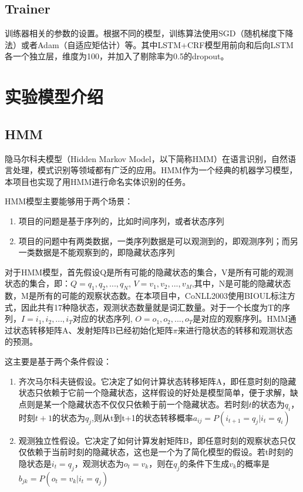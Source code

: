 \documentclass[a4paper, 12pt]{article}
\begin{document}
\subsection{Trainer} %
\label{sub:trainer}
训练器相关的参数的设置。根据不同的模型，训练算法使用SGD（随机梯度下降法）或者Adam（自适应矩估计）等。其中LSTM+CRF模型用前向和后向LSTM各一个独立层，维度为100，并加入了剔除率为0.5的dropout。

\section{实验模型介绍} %
\label{sec:model}

\subsection{HMM} %
\label{sub:hmm}
隐马尔科夫模型（Hidden Markov Model，以下简称HMM）在语言识别，自然语言处理，模式识别等领域都有广泛的应用。HMM作为一个经典的机器学习模型，本项目也实现了用HMM进行命名实体识别的任务。

HMM模型主要能够用于两个场景：
\begin{enumerate}
    \item 项目的问题是基于序列的，比如时间序列，或者状态序列
    \item 项目的问题中有两类数据，一类序列数据是可以观测到的，即观测序列；而另一类数据是不能观察到的，即隐藏状态序列
\end{enumerate}

对于HMM模型，首先假设Q是所有可能的隐藏状态的集合，V是所有可能的观测状态的集合，即：$Q={q_1, q_2, ..., q_N}$, $V={v_1, v_2,...,v_M}$,其中，N是可能的隐藏状态数，M是所有的可能的观察状态数。在本项目中，CoNLL2003使用BIOUL标注方式，因此共有17种隐状态，观测状态数量就是词汇数量。对于一个长度为T的序列，$I={i_1, i_2,...,i_T}$对应的状态序列, $O={o_1, o_2,...,o_T}$是对应的观察序列。HMM通过状态转移矩阵A、发射矩阵B已经初始化矩阵$\pi$来进行隐状态的转移和观测状态的预测。

这主要是基于两个条件假设：

\begin{enumerate}
    \item  齐次马尔科夫链假设。它决定了如何计算状态转移矩阵A，即任意时刻的隐藏状态只依赖于它前一个隐藏状态，这样假设的好处是模型简单，便于求解，缺点则是某一个隐藏状态不仅仅只依赖于前一个隐藏状态。若时刻$t$的状态为$q_i$，时刻$t+1$的状态为$q_j$,则从t到t+1的状态转移概率$a_{ij} = P(i_{t+1}=q_j|i_{t}=q_i)$
    \item 观测独立性假设。它决定了如何计算发射矩阵B，即任意时刻的观察状态只仅仅依赖于当前时刻的隐藏状态，这也是一个为了简化模型的假设。若t时刻的隐状态是$i_t=q_j$，观测状态为$o_t=v_k$，则在$q_j$的条件下生成$v_k$的概率是$b_{jk} = P(o_t=v_k|i_t=q_j)$
\end{enumerate}
\end{document}
